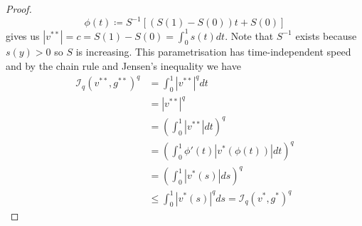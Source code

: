 \documentclass[conference]{IEEEtran}
\theoremstyle{ieeestyle}
\begin{document}
\begin{proof}
    \begin{equation*}
        \phi(t) \coloneqq S^{-1}[(S(1)-S(0))t + S(0)]
    \end{equation*}
    gives us $|v^{**}| = c = S(1) - S(0) = \int_0^1 s(t) dt$. Note that $S^{-1}$ exists because $s(y) > 0$ so $S$ is increasing. This parametrisation has time-independent speed and by the chain rule and Jensen's inequality we have 
    \begin{align*}
        \mathcal{I}_q(v^{**},g^{**})^q &=\int_0^1 |v^{**}|^q dt \\
        &= |v^{**}|^q \\
        &= \left( \int_0^1 |v^{**}| dt \right)^{q}\\
        &= \left( \int_0^1 \phi'(t) |v^*(\phi(t))| dt \right)^q \\
        &=\left(\int_0^1 |v^{*}(s)| ds\right)^q \\
        &\leq \int_0^1 |v^{*}(s)|^q ds = \mathcal{I}_q(v^*,g^*)^q
    \end{align*}
    
\end{proof}
\end{document}
